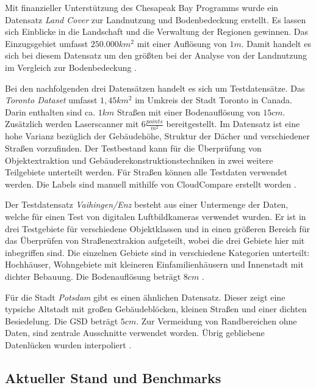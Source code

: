 Mit finanzieller Unterstützung des Chesapeak Bay Programms wurde ein Datensatz \textit{Land Cover} zur Landnutzung und Bodenbedeckung erstellt.
Es lassen sich Einblicke in die Landschaft und die Verwaltung der Regionen gewinnen.
Das Einzugsgebiet umfasst $250.000km^2$ mit einer Auflösung von $1m$. 
Damit handelt es sich bei diesem Datensatz um den größten bei der Analyse von der Landnutzung im Vergleich zur Bodenbedeckung \cite{ChesapeakeConservancy.02.06.2022}.

Bei den nachfolgenden drei Datensätzen handelt es sich um Testdatensätze.
Das \textit{Toronto Dataset} umfasst $1,45km^2$ im Umkreis der Stadt Toronto in Canada. 
Darin enthalten sind ca. $1 km$ Straßen mit einer Bodenauflösung von $15cm$. 
Zusätzlich werden Laserscanner mit $6 \frac{points}{m^2}$ bereitgestellt.
Im Datensatz ist eine hohe Varianz bezüglich der Gebäudehöhe, Struktur der Dächer und verschiedener Straßen vorzufinden.
Der Testbestand kann für die Überprüfung von Objektextraktion und Gebäuderekonstruktionstechniken in zwei weitere Teilgebiete unterteilt werden.
Für Straßen können alle Testdaten verwendet werden.
Die Labels sind manuell mithilfe von CloudCompare erstellt worden \cite{Englich.06.10.2022b,Tan.2020}.

Der Testdatensatz \textit{Vaihingen/Enz} besteht aus einer Untermenge der Daten, welche für einen Test von digitalen Luftbildkameras verwendet wurden.
Er ist in drei Testgebiete für verschiedene Objektklassen und in einen größeren Bereich für das Überprüfen von Straßenextrakion aufgeteilt, wobei die drei Gebiete hier mit inbegriffen sind.
Die einzelnen Gebiete sind in verschiedene Kategorien unterteilt: Hochhäuser, Wohngebiete mit kleineren Einfamilienhäusern und Innenstadt mit dichter Bebauung.
Die Bodenauflösung beträgt $8cm$ \cite{Englich.06.10.2022b}.

Für die Stadt \textit{Potsdam} gibt es einen ähnlichen Datensatz. 
Dieser zeigt eine typsiche Altstadt mit großen Gebäudeblöcken, kleinen Straßen und einer dichten Besiedelung.
Die \ac{GSD} beträgt $5cm$.
Zur Vermeidung von Randbereichen ohne Daten, sind zentrale Ausschnitte verwendet worden.
Übrig gebliebene Datenlücken wurden interpoliert \cite{Englich.17.11.2022, Englich.17.11.2022b}.

\subsection{Aktueller Stand und Benchmarks} \label{sec:state-of-the-art-roads} %

